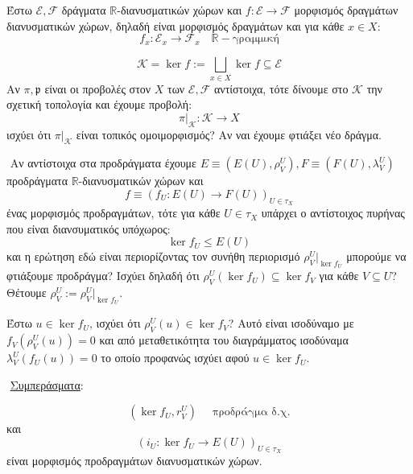 \vspace*{0.3cm}

Έστω $\mathcal{E},\mathcal{F}$ δράγματα $\mathbb{R}$-διανυσματικών χώρων και $f:\mathcal{E}\longrightarrow \mathcal{F}$ μορφισμός δραγμάτων διανυσματικών χώρων, δηλαδή είναι μορφισμός δραγμάτων και για κάθε $x \in X$:
$$f_x : \mathcal{E}_x \longrightarrow \mathcal{F}_x \quad \mathbb{R}-\text{γραμμική}$$

$$\mathcal{K}= \ker f:= \bigsqcup\limits_{x \in X}\ker f \subseteq \mathcal{E}$$ Αν $\pi, \mathfrak{p}$ είναι οι προβολές στον $X$ των $\mathcal{E},\mathcal{F}$ αντίστοιχα, τότε δίνουμε στο $\mathcal{K}$ την σχετική τοπολογία και έχουμε προβολή:
$$\pi|_{\mathcal{K}} : \mathcal{K} \longrightarrow X$$ ισχύει ότι $\pi|_{\mathcal{K}}$ είναι τοπικός ομοιμορφισμός? Αν ναι έχουμε φτιάξει νέο δράγμα.

$ $\newline
Αν αντίστοιχα στα προδράγματα έχουμε $E\equiv (E(U),\rho^U_V), F\equiv(F(U),\lambda^U_V)$ προδράγματα $\mathbb{R}$-διανυσματικών χώρων και
$$f\equiv (f_U: E(U)\longrightarrow F(U))_{U \in \tau_X}$$ ένας μορφισμός προδραγμάτων, τότε για κάθε $U\in\tau_X$ υπάρχει ο αντίστοιχος πυρήνας που είναι διανσυματικός υπόχωρος:
$$\ker f_U \leq E(U)$$ και η ερώτηση εδώ είναι περιορίζοντας τον συνήθη περιορισμό $\rho^U_V|_{\ker f_U}$ μπορούμε να φτιάξουμε προδράγμα? Ισχύει δηλαδή ότι $\rho^U_V(\ker f_U) \subseteq \ker f_V$ για κάθε $V\subseteq U$? Θέτουμε $\rho^U_V := \rho^U_V|_{\ker f_U}$.

\begin{figure}[H]
    \centering
\end{figure}

\noindent Έστω $u \in \ker f_U$, ισχύει ότι $\rho^U_V(u) \in \ker f_V$? Αυτό είναι ισοδύναμο με $f_V(\rho^U_V(u)) = 0$ και από μεταθετικότητα του διαγράμματος ισοδύναμα $\lambda^U_V(f_U(u)) =0$ το οποίο προφανώς ισχύει αφού $u \in \ker f_U$.

$ $\newline
\underline{Συμπεράσματα}:

$$(\ker f_U, r^U_V) \quad \text{ προδράγμα δ.χ.}$$ και $$(i_U: \ker f_U\longrightarrow E(U))_{U \in \tau_X}$$ είναι μορφισμός προδραγμάτων διανυσματικών χώρων.


